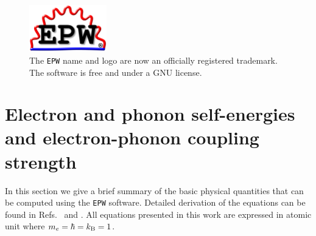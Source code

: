 \documentclass[final,3p,times,twocolumn]{elsarticle}
\begin{document}
\begin{figure}
 \centering
    \includegraphics[width=0.3\textwidth]{EPW_logo_v7.png}
  \caption[]{\label{fig:trademarkEPW} The \texttt{EPW} name and logo are now an officially registered trademark. The software is free and under a GNU license.  }
\end{figure}


\section{Electron and phonon self-energies and electron-phonon coupling strength}\label{theory}

In this section we give a brief summary of the basic physical quantities that can be computed using the \texttt{EPW} software. Detailed derivation of the equations can be found in Refs.~\cite{Giustino2007} and \cite{Margine2013}. All equations presented in this work are expressed in atomic unit where $m_e=\hbar=k_{\rm B}=1$.
\end{document}
